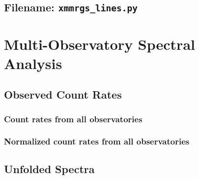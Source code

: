     	\subsection*{Filename: \texttt{xmmrgs\_lines.py}}
    	
    	
    \section{Multi-Observatory Spectral Analysis}
    	\subsection{Observed Count Rates}
    		
    		
    		
    		
    		
    		
    		
    		
    		\newpage
    		\subsubsection*{Count rates from all observatories}
    			
    		
    		\subsubsection*{Normalized count rates from all observatories}
    			
    			
    	\subsection{Unfolded Spectra}
    		
    		
    		
    		
    		
    		
    		
    		
    		
